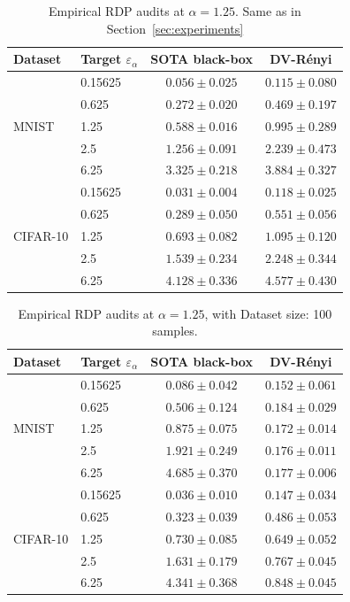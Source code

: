 \documentclass{article}
\theoremstyle{plain}
\theoremstyle{definition}
\theoremstyle{remark}
\begin{document}
\begin{table}[t]
\centering
\caption{Empirical RDP audits at $\alpha=1.25$. Same as in Section~\ref{sec:experiments}}
\label{tab:alpha125-1.0}
\begin{tabular}{llcc}
\toprule
Dataset & Target $\varepsilon_\alpha$ & SOTA black-box \cite{muthu2024nearly} & DV-R\'enyi \\
\midrule
\multirow{5}{*}{MNIST} & 0.15625 & $0.056 \pm 0.025$ & $\mathbf{0.115} \pm 0.080$ \\
 & 0.625 & $0.272 \pm 0.020$ & $\mathbf{0.469} \pm 0.197$ \\
 & 1.25 & $0.588 \pm 0.016$ & $\mathbf{0.995} \pm 0.289$ \\
 & 2.5 & $1.256 \pm 0.091$ & $\mathbf{2.239} \pm 0.473$ \\
 & 6.25 & $3.325 \pm 0.218$ & $\mathbf{3.884} \pm 0.327$ \\
\midrule
\multirow{5}{*}{CIFAR-10} & 0.15625 & $0.031 \pm 0.004$ & $\mathbf{0.118} \pm 0.025$ \\
 & 0.625 & $0.289 \pm 0.050$ & $\mathbf{0.551} \pm 0.056$ \\
 & 1.25 & $0.693 \pm 0.082$ & $\mathbf{1.095} \pm 0.120$ \\
 & 2.5 & $1.539 \pm 0.234$ & $\mathbf{2.248} \pm 0.344$ \\
 & 6.25 & $4.128 \pm 0.336$ & $\mathbf{4.577} \pm 0.430$ \\
\bottomrule
\end{tabular}
\end{table}

\begin{table}[t]
\centering
\caption{Empirical RDP audits at $\alpha=1.25$, with Dataset size: 100 samples.}
\label{tab:alpha125-100samples}
\begin{tabular}{llcc}
\toprule
Dataset & Target $\varepsilon_\alpha$ & SOTA black-box \cite{muthu2024nearly} & DV-R\'enyi \\
\midrule
\multirow{5}{*}{MNIST} & 0.15625 & $0.086 \pm 0.042$ & $\mathbf{0.152} \pm 0.061$ \\
 & 0.625 & $\mathbf{0.506} \pm 0.124$ & $0.184 \pm 0.029$ \\
 & 1.25 & $\mathbf{0.875} \pm 0.075$ & $0.172 \pm 0.014$ \\
 & 2.5 & $\mathbf{1.921} \pm 0.249$ & $0.176 \pm 0.011$ \\
 & 6.25 & $\mathbf{4.685} \pm 0.370$ & $0.177 \pm 0.006$ \\
\midrule
\multirow{5}{*}{CIFAR-10} & 0.15625 & $0.036 \pm 0.010$ & $\mathbf{0.147} \pm 0.034$ \\
 & 0.625 & $0.323 \pm 0.039$ & $\mathbf{0.486} \pm 0.053$ \\
 & 1.25 & $\mathbf{0.730} \pm 0.085$ & $0.649 \pm 0.052$ \\
 & 2.5 & $\mathbf{1.631} \pm 0.179$ & $0.767 \pm 0.045$ \\
 & 6.25 & $\mathbf{4.341} \pm 0.368$ & $0.848 \pm 0.045$ \\
\bottomrule
\end{tabular}
\end{table}
\end{document}
